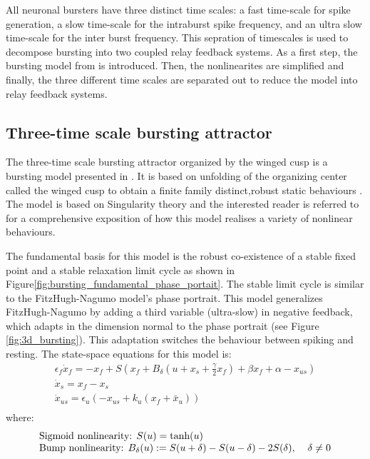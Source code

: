 \documentclass[a4paper, 12pt]{article}
\begin{document}
All neuronal bursters have three distinct time scales: a fast time-scale for spike generation, a slow time-scale for the intraburst spike frequency, and an ultra slow time-scale for the inter burst frequency\cite{franci2}. This sepration of timescales is used to decompose bursting into two coupled relay feedback systems. As a first step, the bursting model from \cite{franci} is introduced. Then, the nonlinearites are simplified and finally, the three different time scales are separated out to reduce the model into relay feedback systems. 

\subsection{Three-time scale bursting attractor}
The three-time scale bursting attractor organized by the winged cusp is a bursting model presented in \cite{franci}. It is based on unfolding of the organizing center called the winged cusp to obtain a finite family distinct,robust static behaviours \cite{franci}. The model is based on Singularity theory and the interested reader is referred to \cite{franci} for a comprehensive exposition of how this model realises a variety of nonlinear behaviours. 

The fundamental basis for this model is the robust co-existence of a stable fixed point and a stable relaxation limit cycle as shown in Figure\ref{fig:bursting_fundamental_phase_portait}. The stable limit cycle is similar to the FitzHugh-Nagumo model's phase portrait. This model generalizes FitzHugh-Nagumo by adding a third variable (ultra-slow)  in negative feedback, which adapts in the dimension normal to the phase portrait (see Figure \ref{fig:3d_bursting}). This adaptation switches the behaviour between spiking and resting. The state-space equations for this model is:
\begin{equation}
\begin{array}{l}
\displaystyle \epsilon_f\dot{x}_{f} = -x_f + S\left(x_f + B_\delta\left(u + x_s + \tfrac{\gamma}{2}x_f\right) + \beta x_f + \alpha  - x_{us}  \right)\\
\displaystyle \dot{x}_{s} = x_f - x_s \\
\displaystyle \dot{x}_{us} = \epsilon_u\left(-x_{us} + k_u(x_f+\bar{x}_u) \right)\\
\end{array}
\label{eq:restSpikeBistability}
\end{equation}
where:
\begin{equation}
\begin{array}{l}
\displaystyle \text{Sigmoid nonlinearity: }S(u) = \text{tanh}(u) \\
\displaystyle \text{Bump nonlinearity: }B_\delta(u) := S(u+\delta) - S(u-\delta) -2S(\delta),\hspace{0.4cm} \delta\neq0
\end{array}
\end{equation}
\end{document}
